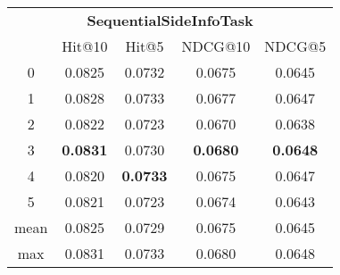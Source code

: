 \documentclass{article}
\begin{document}
 

\begin{tabular}{c|cccc}

\multicolumn{5}{c}{\textbf{SequentialSideInfoTask}} \\
\noalign{\smallskip}
\noalign{\smallskip}
\toprule
\multicolumn{1}{c}{Template ID} & \multicolumn{1}{|c}{Hit@10} & \multicolumn{1}{c}{Hit@5} & \multicolumn{1}{c}{NDCG@10} & \multicolumn{1}{c}{NDCG@5} \\
\midrule
0 & 0.0825 & 0.0732 & 0.0675 & 0.0645 \\
1 & 0.0828 & 0.0733 & 0.0677 & 0.0647 \\
2 & 0.0822 & 0.0723 & 0.0670 & 0.0638 \\
3 & \textbf{0.0831} & 0.0730 & \textbf{0.0680} & \textbf{0.0648} \\
4 & 0.0820 & \textbf{0.0733} & 0.0675 & 0.0647 \\
5 & 0.0821 & 0.0723 & 0.0674 & 0.0643 \\
\midrule
mean & 0.0825 & 0.0729 & 0.0675 & 0.0645 \\
max & 0.0831 & 0.0733 & 0.0680 & 0.0648 \\
\bottomrule

\end{tabular}
\end{document}
